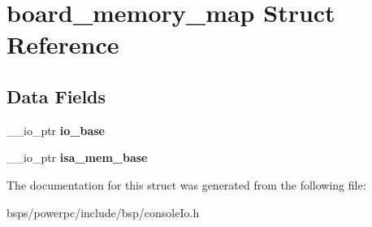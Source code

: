 \hypertarget{structboard__memory__map}{}\section{board\+\_\+memory\+\_\+map Struct Reference}
\label{structboard__memory__map}
\subsection*{Data Fields}
\begin{DoxyCompactItemize}
\item 
\mbox{\label{structboard__memory__map_ada0f2dd0f003fcbf81c5739042ce8894}} 
\+\_\+\+\_\+io\+\_\+ptr {\bfseries io\+\_\+base}
\item 
\mbox{\label{structboard__memory__map_aa4193f638f46fdd44ae4526fe6410620}} 
\+\_\+\+\_\+io\+\_\+ptr {\bfseries isa\+\_\+mem\+\_\+base}
\end{DoxyCompactItemize}


The documentation for this struct was generated from the following file\+:\begin{DoxyCompactItemize}
\item 
bsps/powerpc/include/bsp/console\+Io.\+h\end{DoxyCompactItemize}
